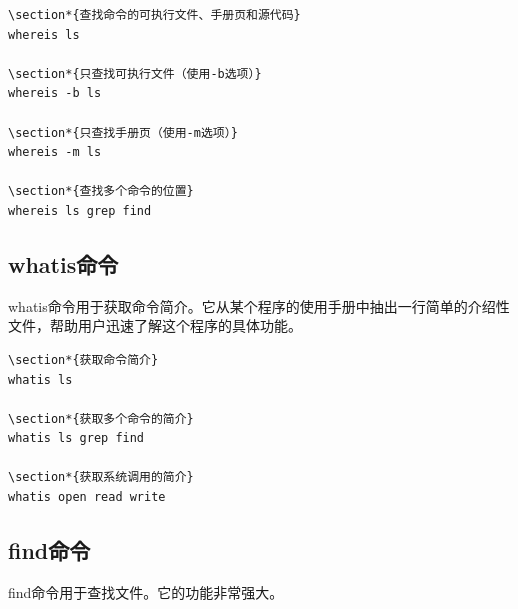 \documentclass[12pt,UTF8]{ctexbook}
\begin{document}
\begin{verbatim}
\section*{查找命令的可执行文件、手册页和源代码}
whereis ls

\section*{只查找可执行文件（使用-b选项）}
whereis -b ls

\section*{只查找手册页（使用-m选项）}
whereis -m ls

\section*{查找多个命令的位置}
whereis ls grep find
\end{verbatim}

\subsection{whatis命令}
whatis命令用于获取命令简介。它从某个程序的使用手册中抽出一行简单的介绍性文件，帮助用户迅速了解这个程序的具体功能。

\begin{verbatim}
\section*{获取命令简介}
whatis ls

\section*{获取多个命令的简介}
whatis ls grep find

\section*{获取系统调用的简介}
whatis open read write
\end{verbatim}

\subsection{find命令}
find命令用于查找文件。它的功能非常强大。
\end{document}
